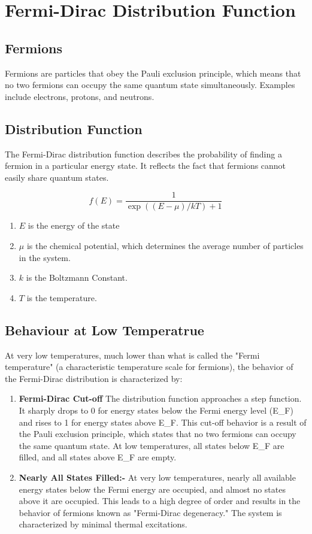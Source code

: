\documentclass{article}
\begin{document}
\section{Fermi-Dirac Distribution Function}

\subsection*{Fermions}
Fermions are particles that obey the Pauli exclusion principle, which means
that no two fermions can occupy the same quantum state simultaneously. Examples
include electrons, protons, and neutrons.

\subsection*{Distribution Function}
The Fermi-Dirac distribution function describes the probability of finding a
fermion in a particular energy state. It reflects the fact that fermions cannot
easily share quantum states.

\begin{equation}
    f(E)=\frac{1}{\exp((E-\mu)/kT)+1}
\end{equation}

\begin{enumerate}
    \item $E$ is the energy of the state
    \item $\mu$ is the chemical potential, which determines the average number of particles in the system.
    \item $k$ is the Boltzmann Constant.
    \item $T$ is the temperature.
\end{enumerate}

\subsection*{Behaviour at Low Temperatrue}
At very low temperatures, much lower than what is called the "Fermi
temperature" (a characteristic temperature scale for fermions), the behavior of
the Fermi-Dirac distribution is characterized by:

\begin{enumerate}
    \item \textbf{Fermi-Dirac Cut-off} The distribution function approaches a step function. It sharply drops to 0 for energy states below the Fermi energy level (E\_F) and rises to 1 for energy states above E\_F. This cut-off behavior is a result of the Pauli exclusion principle, which states that no two fermions can occupy the same quantum state. At low temperatures, all states below E\_F are filled, and all states above E\_F are empty.
    \item \textbf{Nearly All States Filled:-} At very low temperatures, nearly all available energy states below the Fermi energy are occupied, and almost no states above it are occupied. This leads to a high degree of order and results in the behavior of fermions known as "Fermi-Dirac degeneracy." The system is characterized by minimal thermal excitations.
\end{enumerate}
\end{document}
